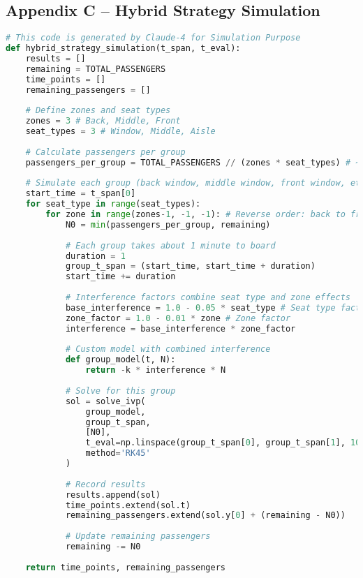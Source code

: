 \documentclass[12pt]{article}
\begin{document}
\subsection{Appendix C – Hybrid Strategy Simulation}

\begin{lstlisting}[language=Python, caption=Hybrid Boarding Strategy Simulation, label=lst:hybrid]
# This code is generated by Claude-4 for Simulation Purpose
def hybrid_strategy_simulation(t_span, t_eval):
    results = []
    remaining = TOTAL_PASSENGERS
    time_points = []
    remaining_passengers = []
    
    # Define zones and seat types
    zones = 3 # Back, Middle, Front
    seat_types = 3 # Window, Middle, Aisle
    
    # Calculate passengers per group
    passengers_per_group = TOTAL_PASSENGERS // (zones * seat_types) # ~13 passengers per group
    
    # Simulate each group (back window, middle window, front window, etc.)
    start_time = t_span[0]
    for seat_type in range(seat_types):
        for zone in range(zones-1, -1, -1): # Reverse order: back to front
            N0 = min(passengers_per_group, remaining)
            
            # Each group takes about 1 minute to board
            duration = 1
            group_t_span = (start_time, start_time + duration)
            start_time += duration
            
            # Interference factors combine seat type and zone effects
            base_interference = 1.0 - 0.05 * seat_type # Seat type factor
            zone_factor = 1.0 - 0.01 * zone # Zone factor
            interference = base_interference * zone_factor
            
            # Custom model with combined interference
            def group_model(t, N):
                return -k * interference * N
                
            # Solve for this group
            sol = solve_ivp(
                group_model,
                group_t_span,
                [N0],
                t_eval=np.linspace(group_t_span[0], group_t_span[1], 10),
                method='RK45'
            )
            
            # Record results
            results.append(sol)
            time_points.extend(sol.t)
            remaining_passengers.extend(sol.y[0] + (remaining - N0))
            
            # Update remaining passengers
            remaining -= N0
            
    return time_points, remaining_passengers
\end{lstlisting}
\end{document}
